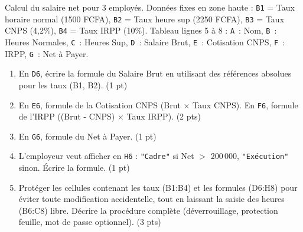 \documentclass[11pt]{article}
\begin{document}
\begin{exercice}
Calcul du salaire net pour 3 employés. Données fixes en zone haute : \texttt{B1} = Taux horaire normal (1500 FCFA), \texttt{B2} = Taux heure sup (2250 FCFA), \texttt{B3} = Taux CNPS (4,2\%), \texttt{B4} = Taux IRPP (10\%). Tableau lignes 5 à 8 : \texttt{A}~: Nom, \texttt{B}~: Heures Normales, \texttt{C}~: Heures Sup, \texttt{D}~: Salaire Brut, \texttt{E}~: Cotisation CNPS, \texttt{F}~: IRPP, \texttt{G}~: Net à Payer.

\begin{enumerate}
\item En \texttt{D6}, écrire la formule du Salaire Brut en utilisant des références absolues pour les taux (B1, B2). (1 pt)
\item En \texttt{E6}, formule de la Cotisation CNPS (Brut $\times$ Taux CNPS). En \texttt{F6}, formule de l'IRPP ((Brut - CNPS) $\times$ Taux IRPP). (2 pts)
\item En \texttt{G6}, formule du Net à Payer. (1 pt)
\item L'employeur veut afficher en \texttt{H6} : \texttt{"Cadre"} si Net $>$ 200\,000, \texttt{"Exécution"} sinon. Écrire la formule. (1 pt)
\item Protéger les cellules contenant les taux (B1:B4) et les formules (D6:H8) pour éviter toute modification accidentelle, tout en laissant la saisie des heures (B6:C8) libre. Décrire la procédure complète (déverrouillage, protection feuille, mot de passe optionnel). (3 pts)
\end{enumerate}
\end{exercice}
\end{document}

